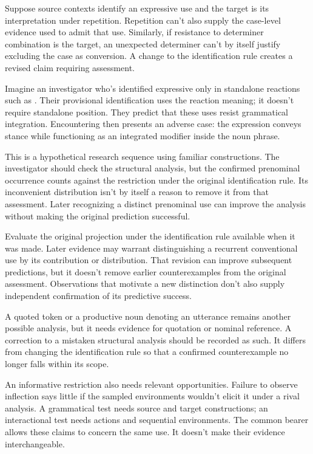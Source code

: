 \documentclass[12pt]{article}
\begin{document}
Suppose source contexts identify an expressive use and the target is
its interpretation under repetition. Repetition can't also supply the
case-level evidence used to admit that use. Similarly, if resistance
to determiner combination is the target, an unexpected determiner
can't by itself justify excluding the case as conversion. A change
to the identification rule creates a revised claim requiring assessment.

Imagine an investigator who's identified expressive 
only in standalone reactions such as . Their provisional identification uses the reaction meaning;
it doesn't require standalone position. They predict that these uses
resist grammatical integration. Encountering  then presents an adverse case: the expression conveys stance
while functioning as an integrated modifier inside the noun phrase.

This is a hypothetical research sequence using familiar constructions.
The investigator should check the structural analysis, but the confirmed
prenominal occurrence counts against the restriction under the original
identification rule. Its inconvenient distribution isn't by itself a
reason to remove it from that assessment. Later recognizing a distinct
prenominal use can improve the analysis without making the original
prediction successful.

Evaluate the original projection under the identification rule available
when it was made. Later evidence may warrant distinguishing a recurrent
conventional use by its contribution or distribution. That revision
can improve subsequent predictions, but it doesn't remove earlier
counterexamples from the original assessment. Observations that motivate
a new distinction don't also supply independent confirmation of its
predictive success.

A quoted token or a productive noun denoting an utterance remains
another possible analysis, but it needs evidence for quotation or
nominal reference. A correction to a mistaken structural analysis should
be recorded as such. It differs from changing the identification rule
so that a confirmed counterexample no longer falls within its scope.

An informative restriction also needs relevant opportunities. Failure
to observe inflection says little if the sampled environments wouldn't
elicit it under a rival analysis. A grammatical test needs source and
target constructions; an interactional test needs actions and sequential
environments. The common bearer allows these claims to concern the
same use. It doesn't make their evidence interchangeable.
\end{document}
